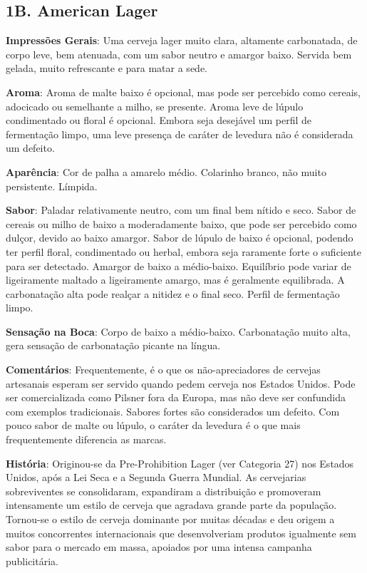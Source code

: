 \subsection*{1B. American Lager}
\textbf{Impressões Gerais}: Uma cerveja lager muito clara, altamente carbonatada, de corpo leve, bem atenuada, com um sabor neutro e amargor baixo. Servida bem gelada, muito refrescante e para matar a sede.

\textbf{Aroma}: Aroma de malte baixo é opcional, mas pode ser percebido como cereais, adocicado ou semelhante a milho, se presente. Aroma leve de lúpulo condimentado ou floral é opcional. Embora seja desejável um perfil de fermentação limpo, uma leve presença de caráter de levedura não é considerada um defeito.

\textbf{Aparência}: Cor de palha a amarelo médio. Colarinho branco, não muito persistente. Límpida.

\textbf{Sabor}: Paladar relativamente neutro, com um final bem nítido e seco. Sabor de cereais ou milho de baixo a moderadamente baixo, que pode ser percebido como dulçor, devido ao baixo amargor. Sabor de lúpulo de baixo é opcional, podendo ter perfil floral, condimentado ou herbal, embora seja raramente forte o suficiente para ser detectado. Amargor de baixo a médio-baixo. Equilíbrio pode variar de ligeiramente maltado a ligeiramente amargo, mas é geralmente equilibrada. A carbonatação alta pode realçar a nitidez e o final seco. Perfil de fermentação limpo.

\textbf{Sensação na Boca}: Corpo de baixo a médio-baixo. Carbonatação muito alta, gera sensação de carbonatação picante na língua.

\textbf{Comentários}: Frequentemente, é o que os não-apreciadores de cervejas artesanais esperam ser servido quando pedem cerveja nos Estados Unidos. Pode ser comercializada como Pilsner fora da Europa, mas não deve ser confundida com exemplos tradicionais. Sabores fortes são considerados um defeito. Com pouco sabor de malte ou lúpulo, o caráter da levedura é o que mais frequentemente diferencia as marcas.

\textbf{História}: Originou-se da Pre-Prohibition Lager (ver Categoria 27) nos Estados Unidos, após a Lei Seca e a Segunda Guerra Mundial. As cervejarias sobreviventes se consolidaram, expandiram a distribuição e promoveram intensamente um estilo de cerveja que agradava grande parte da população. Tornou-se o estilo de cerveja dominante por muitas décadas e deu origem a muitos concorrentes internacionais que desenvolveriam produtos igualmente sem sabor para o mercado em massa, apoiados por uma intensa campanha publicitária.

